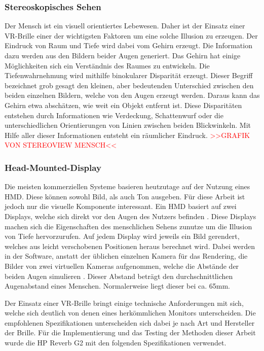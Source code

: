 \subsubsection{Stereoskopisches Sehen}


Der Mensch ist ein visuell orientiertes Lebewesen. Daher ist der Einsatz einer VR-Brille einer der wichtigsten
Faktoren um eine solche Illusion zu erzeugen. Der Eindruck von Raum und Tiefe wird dabei vom Gehirn erzeugt.
Die Information dazu werden aus den Bildern beider Augen generiert.
Das Gehirn hat einige Möglichkeiten sich ein Verständnis des Raumes zu entwickeln.
Die Tiefenwahrnehmung wird mithilfe binokularer Disparität erzeugt. Dieser Begriff bezeichnet grob gesagt den kleinen, aber bedeutenden
Unterschied zwischen den beiden einzelnen Bildern, welche von den Augen erzeugt werden. Daraus kann das Gehirn etwa
abschätzen, wie weit ein Objekt entfernt ist.
Diese Disparitäten entstehen durch Informationen wie Verdeckung, Schattenwurf oder die unterschiedlichen Orientierungen von Linien zwischen
beiden Blickwinkeln. \parencite{Tauer2010}
Mit Hilfe aller dieser Informationen entsteht ein räumlicher Eindruck.
\textcolor{red}{>>GRAFIK VON STEREOVIEW MENSCH<<}


\subsubsection{Head-Mounted-Display}
Die meisten kommerziellen Systeme basieren heutzutage auf der Nutzung eines HMD.
Diese können sowohl Bild, als auch Ton ausgeben. Für diese Arbeit ist jedoch nur die visuelle Komponente interessant.
Ein HMD basiert auf zwei Displays, welche sich direkt vor den Augen des Nutzers befinden \parencite{Sutherland1968}.
Diese Displays machen sich die Eigenschaften des menschlichen Sehens zunutze um die Illusion von Tiefe hervorzurufen.
Auf jedem Display wird jeweils ein Bild gerendert, welches aus leicht verschobenen Positionen heraus berechnet wird.
Dabei werden in der Software, anstatt der üblichen einzelnen Kamera für das Rendering, die Bilder von zwei virtuellen Kameras aufgenommen,
welche die Abstände der beiden Augen simulieren \parencite{NVIDIA2010}. Dieser Abstand beträgt den durchschnittlichen
Augenabstand eines Menschen. Normalerweise liegt dieser bei ca. 65mm.

Der Einsatz einer VR-Brille bringt einige technische Anforderungen mit sich, welche sich deutlich
von denen eines herkömmlichen Monitors unterscheiden. Die empfohlenen Spezifikationen unterscheiden sich dabei je nach Art und
Hersteller der Brille. Für die Implementierung und das Testing der Methoden dieser Arbeit wurde die HP Reverb G2 mit den folgenden
Spezifikationen verwendet.


